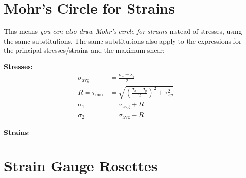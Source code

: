 \documentclass[11pt]{article}
\begin{document}
\section*{Mohr's Circle for Strains}

\noindent
This means \emph{you can also draw Mohr's circle for strains} instead of stresses, using the
same substitutions. The same substitutions also apply to the expressions for the principal
stresses/strains and the maximum shear:

\noindent
\begin{minipage}[t]{0.48\textwidth}
\centering
\textbf{Stresses:}
\begin{align*}
  \sigma_{\text{avg}} &= \frac{\sigma_x + \sigma_y}{2} \\
  R = \tau_{\max} &= \sqrt{\left(\frac{\sigma_x - \sigma_y}{2}\right)^2 + \tau_{xy}^2} \\
  \sigma_1 &= \sigma_{\text{avg}} + R \\
  \sigma_2 &= \sigma_{\text{avg}} - R
\end{align*}
\end{minipage}%
\hfill
\begin{minipage}[t]{0.48\textwidth}
\centering
\textbf{Strains:}\\[0.4em]
\end{minipage}

\section*{Strain Gauge Rosettes}
\end{document}
